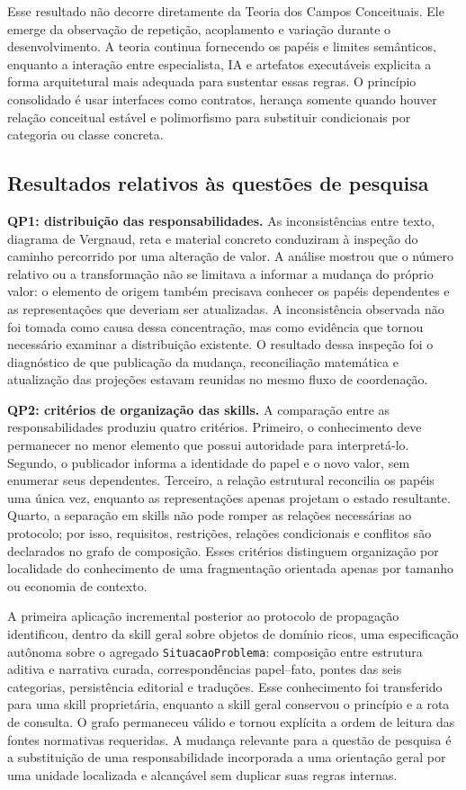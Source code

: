 \documentclass[preprint,12pt,authoryear]{elsarticle}
\begin{document}
Esse resultado não decorre diretamente da Teoria dos Campos Conceituais. Ele emerge da observação de repetição, acoplamento e variação durante o desenvolvimento. A teoria continua fornecendo os papéis e limites semânticos, enquanto a interação entre especialista, IA e artefatos executáveis explicita a forma arquitetural mais adequada para sustentar essas regras. O princípio consolidado é usar interfaces como contratos, herança somente quando houver relação conceitual estável e polimorfismo para substituir condicionais por categoria ou classe concreta.

\subsection{Resultados relativos às questões de pesquisa}

\textbf{QP1: distribuição das responsabilidades.} As inconsistências entre texto, diagrama de Vergnaud, reta e material concreto conduziram à inspeção do caminho percorrido por uma alteração de valor. A análise mostrou que o número relativo ou a transformação não se limitava a informar a mudança do próprio valor: o elemento de origem também precisava conhecer os papéis dependentes e as representações que deveriam ser atualizadas. A inconsistência observada não foi tomada como causa dessa concentração, mas como evidência que tornou necessário examinar a distribuição existente. O resultado dessa inspeção foi o diagnóstico de que publicação da mudança, reconciliação matemática e atualização das projeções estavam reunidas no mesmo fluxo de coordenação.

\textbf{QP2: critérios de organização das skills.} A comparação entre as responsabilidades produziu quatro critérios. Primeiro, o conhecimento deve permanecer no menor elemento que possui autoridade para interpretá-lo. Segundo, o publicador informa a identidade do papel e o novo valor, sem enumerar seus dependentes. Terceiro, a relação estrutural reconcilia os papéis uma única vez, enquanto as representações apenas projetam o estado resultante. Quarto, a separação em skills não pode romper as relações necessárias ao protocolo; por isso, requisitos, restrições, relações condicionais e conflitos são declarados no grafo de composição. Esses critérios distinguem organização por localidade do conhecimento de uma fragmentação orientada apenas por tamanho ou economia de contexto.

A primeira aplicação incremental posterior ao protocolo de propagação identificou, dentro da skill geral sobre objetos de domínio ricos, uma especificação autônoma sobre o agregado \texttt{SituacaoProblema}: composição entre estrutura aditiva e narrativa curada, correspondências papel--fato, pontes das seis categorias, persistência editorial e traduções. Esse conhecimento foi transferido para uma skill proprietária, enquanto a skill geral conservou o princípio e a rota de consulta. O grafo permaneceu válido e tornou explícita a ordem de leitura das fontes normativas requeridas. A mudança relevante para a questão de pesquisa é a substituição de uma responsabilidade incorporada a uma orientação geral por uma unidade localizada e alcançável sem duplicar suas regras internas.
\end{document}

